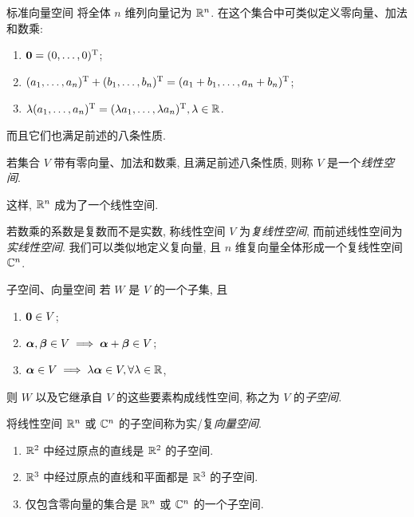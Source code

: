 \begin{frame}{标准向量空间}
	\onslide<+->
	将全体 $n$ 维列向量记为 ${\mathbb{R}}^n$.
	\onslide<+->
	在这个集合中可类似定义零向量、加法和数乘:
	\begin{enumerate}
		\item ${\bf0}=(0,\dots,0)^{\mathrm{T}}$;
		\item $(a_1,\dots,a_n)^{\mathrm{T}}+(b_1,\dots,b_n)^{\mathrm{T}}=(a_1+b_1,\dots,a_n+b_n)^{\mathrm{T}}$;
		\item $\lambda(a_1,\dots,a_n)^{\mathrm{T}}=(\lambda a_1,\dots,\lambda a_n)^{\mathrm{T}},\lambda\in{\mathbb{R}}$.
	\end{enumerate}
	\onslide<+->
	而且它们也满足前述的八条性质.
	\onslide<+->
	\begin{definition}
		若集合 $V$ 带有零向量、加法和数乘, 且满足前述八条性质, 则称 $V$ 是一个\emph{线性空间}.
	\end{definition}
	\onslide<+->
	这样, ${\mathbb{R}}^n$ 成为了一个线性空间.

	\onslide<+->
	若数乘的系数是复数而不是实数, 称线性空间 $V$ 为\emph{复线性空间}, 而前述线性空间为\emph{实线性空间}.
	\onslide<+->
	我们可以类似地定义复向量, 且 $n$ 维复向量全体形成一个复线性空间 ${\mathbb{C}}^n$.
\end{frame}


\begin{frame}{子空间、向量空间\noexer}
	\onslide<+->
	若 $W$ 是 $V$ 的一个子集, 且
	\begin{enumerate}
		\item ${\bf0}\in V$;
		\item ${\boldsymbol{\alpha}},{\boldsymbol{\beta}}\in V\implies {\boldsymbol{\alpha}}+{\boldsymbol{\beta}}\in V$;
		\item ${\boldsymbol{\alpha}}\in V\implies \lambda{\boldsymbol{\alpha}}\in V, \forall\lambda\in{\mathbb{R}}$,
	\end{enumerate}
	\onslide<+->
	则 $W$ 以及它继承自 $V$ 的这些要素构成线性空间, 称之为 $V$ 的\emph{子空间}.

	\onslide<+->
	将线性空间 ${\mathbb{R}}^n$ 或 ${\mathbb{C}}^n$ 的子空间称为实/复\emph{向量空间}.
	\onslide<+->
	\begin{example}
		\begin{enumerate}
			\item ${\mathbb{R}}^2$ 中经过原点的直线是 ${\mathbb{R}}^2$ 的子空间.
			\item ${\mathbb{R}}^3$ 中经过原点的直线和平面都是 ${\mathbb{R}}^3$ 的子空间. 
			\item 仅包含零向量的集合是 ${\mathbb{R}}^n$ 或 ${\mathbb{C}}^n$ 的一个子空间.
		\end{enumerate}
	\end{example}
\end{frame}


